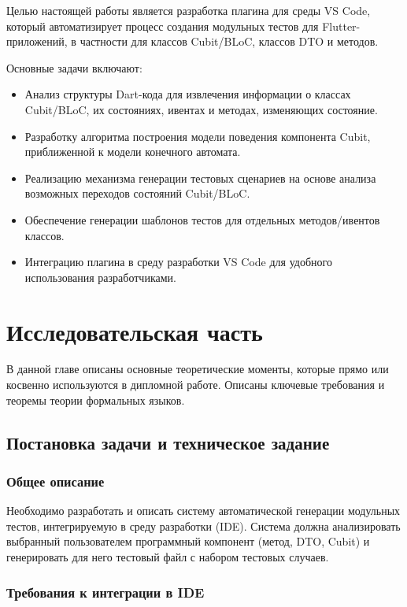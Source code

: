 \documentclass[14pt, russian]{scrartcl}
\begin{document}
Целью настоящей работы является разработка плагина для среды VS Code, который автоматизирует процесс создания модульных тестов для Flutter-приложений, в частности для классов Cubit/BLoC, классов DTO и методов.

Основные задачи включают:
\begin{itemize}
    \item Анализ структуры Dart-кода для извлечения информации о классах Cubit/BLoC, их состояниях, ивентах и методах, изменяющих состояние.
    \item Разработку алгоритма построения модели поведения компонента Cubit, приближенной к модели конечного автомата.
    \item Реализацию механизма генерации тестовых сценариев на основе анализа возможных переходов состояний Cubit/BLoC.
    \item Обеспечение генерации шаблонов тестов для отдельных методов/ивентов классов.
    \item Интеграцию плагина в среду разработки VS Code для удобного использования разработчиками.
\end{itemize}

\section{Исследовательская часть}

В данной главе описаны основные теоретические моменты, которые прямо или косвенно используются в дипломной работе. Описаны ключевые требования и теоремы теории формальных языков.

\subsection{Постановка задачи и техническое задание}

\subsubsection{Общее описание}

Необходимо разработать и описать систему автоматической генерации модульных тестов, интегрируемую в среду разработки (IDE). Система должна анализировать выбранный пользователем программный компонент (метод, DTO, Cubit) и генерировать для него тестовый файл с набором тестовых случаев.

\subsubsection{Требования к интеграции в IDE}
\end{document}
